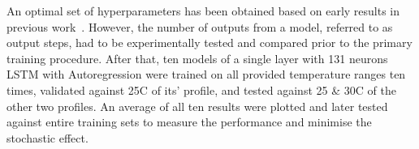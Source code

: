  {
An optimal set of hyperparameters has been obtained based on early results in previous work~\cite{sadykov_practical_2022}.
}
However, the number of outputs from a model, referred to as output steps, had to be experimentally tested and compared prior to the primary training procedure.
After that, ten models of a single layer with 131 neurons LSTM with Autoregression were trained on all provided temperature ranges ten times, validated against 25\textdegree{}C of its' profile, and tested against 25 \& 30\textdegree{}C of the other two profiles.
An average of all ten results were plotted and later tested against entire training sets to measure the performance and minimise the stochastic effect.

